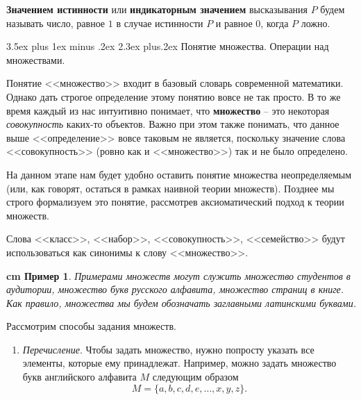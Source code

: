 \documentclass[12pt, russian]{article}
\makeatletter
\renewcommand\subsection{\@startsection {subsection}{2}{\parindent}%
{3.5ex plus 1ex minus .2ex}%
{2.3ex plus.2ex}%
{\normalfont\large\bfseries}}
\newtheorem{example}{\hskip 0.5 cm Пример}%
\makeatother
\begin{document}
\textbf{Значением истинности} или \textbf{индикаторным значением} высказывания $P$ будем называть число, равное $1$ в случае истинности $P$ и равное $0$, когда $P$ ложно.

\subsection{Понятие множества. Операции над множествами.}

Понятие <<множество>> входит в базовый словарь современной математики. Однако дать строгое определение этому понятию вовсе не так просто. В то же время каждый из нас интуитивно понимает, что \textbf{множество} -- это некоторая \textit{совокупность} каких-то объектов. Важно при этом также понимать, что данное выше <<определение>> вовсе таковым не является, поскольку значение слова <<совокупность>> (ровно как и <<множество>>) так и не было определено.

На данном этапе нам будет удобно оставить понятие множества неопределяемым (или, как говорят, остаться в рамках наивной теории множеств). Позднее мы строго формализуем это понятие, рассмотрев аксиоматический подход к теории множеств.

Слова <<класс>>, <<набор>>, <<совокупность>>, <<семейство>> будут использоваться как синонимы к слову <<множество>>.

\begin{example}
	Примерами множеств могут служить множество студентов в аудитории,  множество букв русского алфавита, множество страниц в книге. Как правило, множества мы будем обозначать заглавными латинскими буквами.
\end{example}

Рассмотрим способы задания множеств.

\begin{enumerate}
	\item \textit{Перечисление}. Чтобы задать множество, нужно попросту указать все элементы, которые ему принадлежат. Например, можно задать множество букв английского алфавита $M$ следующим образом
	$$
	M = \{ a, b, c, d, e, \ldots, x, y, z \}.
	$$

\end{enumerate}




\newpage
\begin{thebibliography}{99}


\end{thebibliography}

\end{document}
